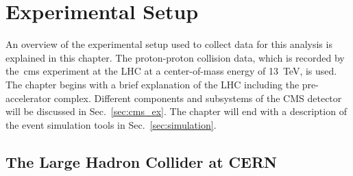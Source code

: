 \chapter{Experimental Setup}
An overview of the experimental setup used to collect data for this analysis is explained in this chapter. The proton-proton collision data, which is recorded by the~\acrshort{cms} experiment at the LHC at a center-of-mass energy of 13~TeV, is used.
The chapter begins with a brief explanation of the LHC including the pre-accelerator complex. Different components and subsystems of the CMS detector will be discussed in Sec.~\ref{sec:cms_ex}. The chapter will end with a description of the event simulation tools in Sec.~\ref{sec:simulation}. 
\section{The Large Hadron Collider at CERN}

